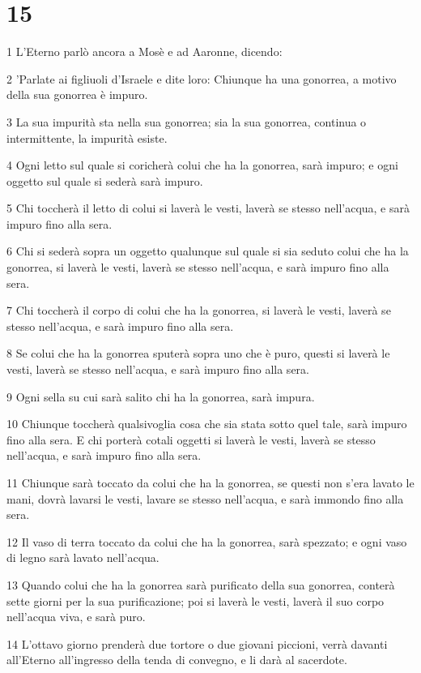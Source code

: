 \chapter{15}

\par 1 L'Eterno parlò ancora a Mosè e ad Aaronne, dicendo:
\par 2 'Parlate ai figliuoli d'Israele e dite loro: Chiunque ha una gonorrea, a motivo della sua gonorrea è impuro.
\par 3 La sua impurità sta nella sua gonorrea; sia la sua gonorrea, continua o intermittente, la impurità esiste.
\par 4 Ogni letto sul quale si coricherà colui che ha la gonorrea, sarà impuro; e ogni oggetto sul quale si sederà sarà impuro.
\par 5 Chi toccherà il letto di colui si laverà le vesti, laverà se stesso nell'acqua, e sarà impuro fino alla sera.
\par 6 Chi si sederà sopra un oggetto qualunque sul quale si sia seduto colui che ha la gonorrea, si laverà le vesti, laverà se stesso nell'acqua, e sarà impuro fino alla sera.
\par 7 Chi toccherà il corpo di colui che ha la gonorrea, si laverà le vesti, laverà se stesso nell'acqua, e sarà impuro fino alla sera.
\par 8 Se colui che ha la gonorrea sputerà sopra uno che è puro, questi si laverà le vesti, laverà se stesso nell'acqua, e sarà impuro fino alla sera.
\par 9 Ogni sella su cui sarà salito chi ha la gonorrea, sarà impura.
\par 10 Chiunque toccherà qualsivoglia cosa che sia stata sotto quel tale, sarà impuro fino alla sera. E chi porterà cotali oggetti si laverà le vesti, laverà se stesso nell'acqua, e sarà impuro fino alla sera.
\par 11 Chiunque sarà toccato da colui che ha la gonorrea, se questi non s'era lavato le mani, dovrà lavarsi le vesti, lavare se stesso nell'acqua, e sarà immondo fino alla sera.
\par 12 Il vaso di terra toccato da colui che ha la gonorrea, sarà spezzato; e ogni vaso di legno sarà lavato nell'acqua.
\par 13 Quando colui che ha la gonorrea sarà purificato della sua gonorrea, conterà sette giorni per la sua purificazione; poi si laverà le vesti, laverà il suo corpo nell'acqua viva, e sarà puro.
\par 14 L'ottavo giorno prenderà due tortore o due giovani piccioni, verrà davanti all'Eterno all'ingresso della tenda di convegno, e li darà al sacerdote.

